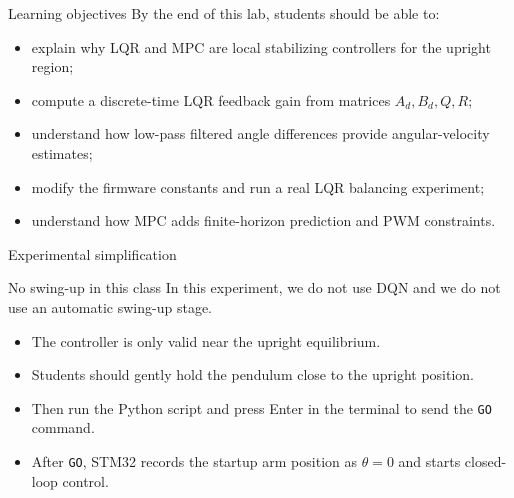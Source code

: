 \documentclass[aspectratio=169]{beamer}
\begin{document}
\begin{frame}{Learning objectives}
By the end of this lab, students should be able to:
\vspace{0.25cm}
\begin{itemize}
    \item explain why LQR and MPC are local stabilizing controllers for the upright region;
    \vspace{0.2cm}
    \item compute a discrete-time LQR feedback gain from matrices $A_d,B_d,Q,R$;
    \vspace{0.2cm}
    \item understand how low-pass filtered angle differences provide angular-velocity estimates;
    \vspace{0.2cm}
    \item modify the firmware constants and run a real LQR balancing experiment;
    \vspace{0.2cm}
    \item understand how MPC adds finite-horizon prediction and PWM constraints.
\end{itemize}
\end{frame}

\begin{frame}{Experimental simplification}
\begin{alertblock}{No swing-up in this class}
\small
In this experiment, we do not use DQN and we do not use an automatic swing-up stage.
\end{alertblock}

\vspace{0.25cm}

\begin{itemize}
    \item The controller is only valid near the upright equilibrium.
    \vspace{0.25cm}
    \item Students should gently hold the pendulum close to the upright position.
    \vspace{0.25cm}
    \item Then run the Python script and press Enter in the terminal to send the \texttt{GO} command.
    \vspace{0.25cm}
    \item After \texttt{GO}, STM32 records the startup arm position as $\theta=0$ and starts closed-loop control.
\end{itemize}
\end{frame}
\end{document}
